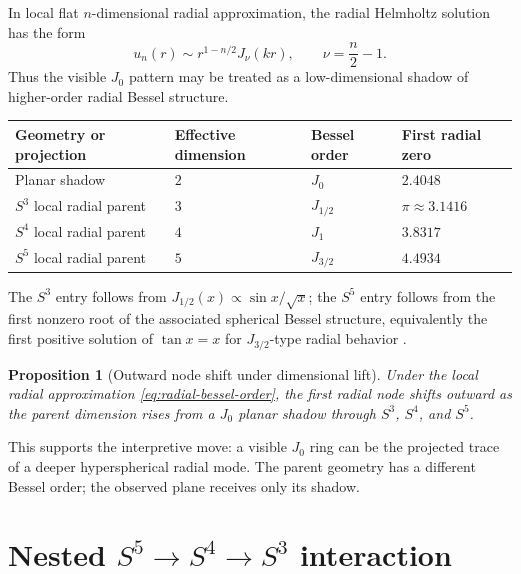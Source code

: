 \documentclass[11pt]{article}
\newtheorem{proposition}{Proposition}
\begin{document}
In local flat $n$-dimensional radial approximation, the radial Helmholtz solution has the form
\begin{equation}
 u_n(r)\sim r^{1-n/2}J_{\nu}(kr),
 \qquad
 \nu=\frac n2-1.
 \label{eq:radial-bessel-order}
\end{equation}
Thus the visible $J_0$ pattern may be treated as a low-dimensional shadow of higher-order radial Bessel structure.

\begin{longtable}{@{}llll@{}}
\toprule
Geometry or projection & Effective dimension & Bessel order & First radial zero \\
\midrule
Planar shadow & $2$ & $J_0$ & $2.4048$ \\
$S^3$ local radial parent & $3$ & $J_{1/2}$ & $\pi\approx3.1416$ \\
$S^4$ local radial parent & $4$ & $J_1$ & $3.8317$ \\
$S^5$ local radial parent & $5$ & $J_{3/2}$ & $4.4934$ \\
\bottomrule
\end{longtable}

The $S^3$ entry follows from $J_{1/2}(x)\propto \sin x/\sqrt{x}$; the $S^5$ entry follows from the first nonzero root of the associated spherical Bessel structure, equivalently the first positive solution of $\tan x=x$ for $J_{3/2}$-type radial behavior \citep{DLMFSphericalBesselZeros}.

\begin{proposition}[Outward node shift under dimensional lift]
Under the local radial approximation \eqref{eq:radial-bessel-order}, the first radial node shifts outward as the parent dimension rises from a $J_0$ planar shadow through $S^3$, $S^4$, and $S^5$.
\end{proposition}

This supports the interpretive move: a visible $J_0$ ring can be the projected trace of a deeper hyperspherical radial mode.  The parent geometry has a different Bessel order; the observed plane receives only its shadow.

\section{\texorpdfstring{Nested $S^5\rightarrow S^4\rightarrow S^3$ interaction}{Nested S5 to S4 to S3 interaction}}
\end{document}
